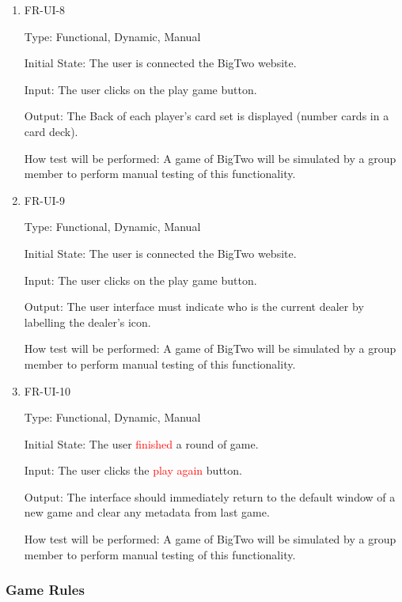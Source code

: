 \documentclass[12pt, titlepage]{article}
\begin{document}
\begin{enumerate}
\item{FR-UI-8\\}

Type: Functional, Dynamic, Manual
					
Initial State: The user is connected the BigTwo website.
					
Input: The user clicks on the play game button.
					
Output: The Back of each player's card set is displayed (number cards in a card deck).
					
How test will be performed: A game of BigTwo will be simulated by a group member to perform manual testing of this functionality.

\item{FR-UI-9\\}

Type: Functional, Dynamic, Manual
					
Initial State: The user is connected the BigTwo website.
					
Input: The user clicks on the play game button.
					
Output: The user interface must indicate who is the current dealer by labelling the dealer's icon.
					
How test will be performed: A game of BigTwo will be simulated by a group member to perform manual testing of this functionality.


\item{FR-UI-10\\}

Type: Functional, Dynamic, Manual
					
Initial State: The user \textcolor{red}{finished} a round of game.
					
Input: The user clicks the \textcolor{red}{play again} button.
					
Output: The interface should immediately return to the default window of a new game and clear any metadata from last game.
					
How test will be performed: A game of BigTwo will be simulated by a group member to perform manual testing of this functionality.


\end{enumerate}


\subsubsection{Game Rules}
\end{document}
